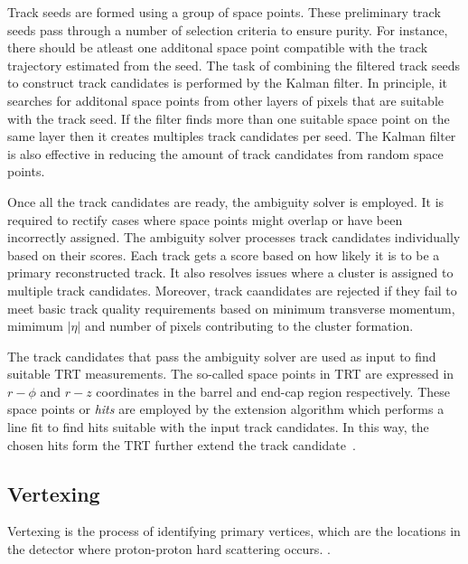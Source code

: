 Track seeds are formed using a group of space points. These preliminary track seeds pass through a number of selection criteria to ensure purity. For instance, there should be atleast one 
additonal space point compatible with the track trajectory estimated from the seed. The task of combining the filtered track seeds to construct track candidates is performed by 
the Kalman filter. In principle, it searches for additonal space points from other layers of pixels that are suitable with the track seed. If the filter finds more than one suitable space 
point on the same layer then it creates multiples track candidates per seed. The Kalman filter is also effective in reducing the amount of track candidates from random space points. 

Once all the track candidates are ready, the ambiguity solver is employed. It is required to rectify cases where space points might overlap or have been incorrectly assigned. 
The ambiguity solver processes track candidates individually based on their scores. Each track gets a score based on how likely it is to be a primary reconstructed track. 
It also resolves issues where a cluster is assigned to multiple track candidates. Moreover, track caandidates are rejected if they fail to meet basic track quality requirements based on
minimum transverse momentum, mimimum $|\eta|$ and number of pixels contributing to the cluster formation.

The track candidates that pass the ambiguity solver are used as input to find suitable TRT measurements. The so-called space points in TRT are expressed in $r-\phi$
and $r-z$ coordinates in the barrel and end-cap region respectively. These space points or \textit{hits} are employed by the extension algorithm which performs
a line fit to find hits suitable with the input track candidates. In this way, the chosen hits form the TRT further extend the track candidate~\cite{T_Cornelissen_2008}.

\subsection{Vertexing}
Vertexing is the process of identifying primary vertices, which are the locations in the detector where proton-proton hard scattering occurs. .

